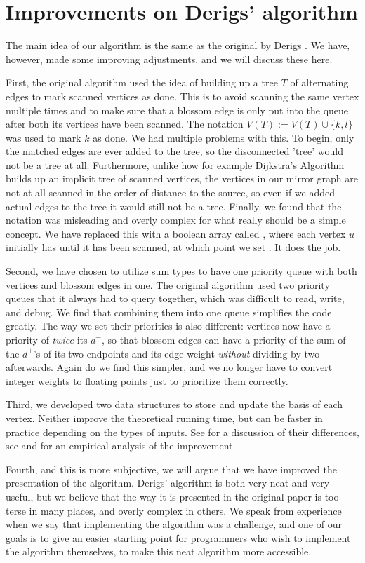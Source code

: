 \section{Improvements on Derigs' algorithm}
The main idea of our algorithm is the same as the original by Derigs \cite{source:derigs_shortest_odd_path}. We have, however, made some improving adjustments, and we will discuss these here.

First, the original algorithm used the idea of building up a tree $T$ of alternating edges to mark scanned vertices as done. This is to avoid scanning the same vertex multiple times and to make sure that a blossom edge is only put into the queue after both its vertices have been scanned. The notation $V(T) := V(T) \cup \{k,l\}$ was used to mark $k$ as done. We had multiple problems with this. To begin, only the matched edges are ever added to the tree, so the disconnected 'tree' would not be a tree at all. Furthermore, unlike how for example Dijkstra's Algorithm builds up an implicit tree of scanned vertices, the vertices in our mirror graph are not at all scanned in the order of distance to the source, so even if we added actual edges to the tree it would still not be a tree. Finally, we found that the notation was misleading and overly complex for what really should be a simple concept. We have replaced this with a boolean array called , where each vertex $u$ initially has  until it has been scanned, at which point we set . It does the job.

Second, we have chosen to utilize sum types to have one priority queue with both vertices and blossom edges in one. The original algorithm used two priority queues that it always had to query together, which was difficult to read, write, and debug. We find that combining them into one queue simplifies the code greatly. The way we set their priorities is also different: vertices now have a priority of \emph{twice} its $d^-$, so that blossom edges can have a priority of the sum of the $d^+$'s of its two endpoints and its edge weight \emph{without} dividing by two afterwards. Again do we find this simpler, and we no longer have to convert integer weights to floating points just to prioritize them correctly.

Third, we developed two data structures to store and update the basis of each vertex. Neither improve the theoretical running time, but can be faster in practice depending on the types of inputs. See  for a discussion of their differences, see and  for an empirical analysis of the improvement.
 
Fourth, and this is more subjective, we will argue that we have improved the presentation of the algorithm. Derigs' algorithm is both very neat and very useful, but we believe that the way it is presented in the original paper \cite{source:derigs_shortest_odd_path} is too terse in many places, and overly complex in others. We speak from experience when we say that implementing the algorithm was a challenge, and one of our goals is to give an easier starting point for programmers who wish to implement the algorithm themselves, to make this neat algorithm more accessible.
